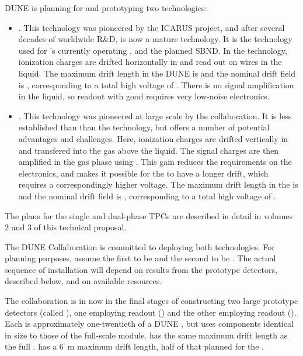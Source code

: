 DUNE is planning for and prototyping two \lartpc technologies:
\begin{itemize}
\item \single. This technology was pioneered by the ICARUS project, and after several decades of worldwide R\&D, is now a mature technology. It is the technology used for \fnal{}'s currently operating \microboone, and the planned SBND. In the \single technology, ionization charges are drifted horizontally in \lar and read out on wires in the liquid. The maximum drift length in the DUNE  is \spmaxdrift and the nominal drift field is \spmaxfield, corresponding to a total high voltage of \sptargetdriftvoltpos. There is no signal amplification in the liquid, so readout with good  requires very low-noise electronics.

\item \dual. This technology was pioneered at large scale by the  collaboration. It is less established than than the \single technology, but offers a number of potential advantages and challenges. Here, ionization charges are drifted vertically in \lar and transfered into the gas above the liquid. The signal charges are then amplified in the gas phase using . This gain reduces the requirements on the electronics, and makes it possible for the  to have a longer drift, which requires a correspondingly higher voltage.
The maximum drift length in the  is \dpmaxdrift and the nominal drift field is \dpnominaldriftfield, corresponding to a total high voltage of \dptargetdriftvoltpos. 

\end{itemize}
The plans for the single and dual-phase TPCs are described in detail in volumes 2 and 3 of this technical proposal.

The DUNE Collaboration is committed to deploying both technologies. 
For planning purposes, assume the first  to be
\single and the second to be \dual.
The actual sequence of  installation will depend on results from the prototype detectors, described below, and on available resources.


The collaboration is in now in the final stages of constructing two large prototype detectors (called ), one employing \single readout () and the other employing \dual readout (). Each is approximately one-twentieth of a DUNE , but uses components identical in size to those of the full-scale module.  has the same \spmaxdrift maximum drift length as the full .  has a \SI{6}{m} maximum drift length, half of that planned for the . 

